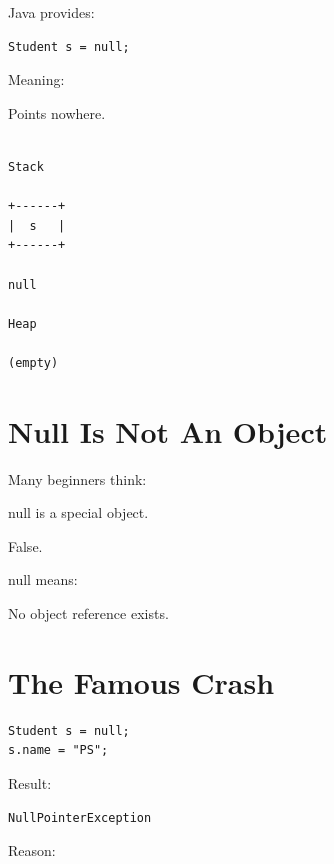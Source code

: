\documentclass[11pt,a4paper]{book}
\begin{document}
Java provides:

\begin{verbatim}
Student s = null;
\end{verbatim}

Meaning:

\begin{center}
Points nowhere.
\end{center}


\begin{verbatim}

Stack

+------+
|  s   |
+------+

null

Heap

(empty)

\end{verbatim}


\section{Null Is Not An Object}

\begin{trap}

Many beginners think:

null is a special object.

False.

null means:

No object reference exists.

\end{trap}


\section{The Famous Crash}

\begin{verbatim}
Student s = null;
s.name = "PS";
\end{verbatim}

Result:

\begin{verbatim}
NullPointerException
\end{verbatim}

Reason:
\end{document}
